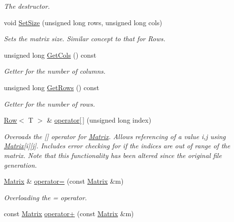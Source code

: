 \begin{DoxyCompactItemize}
\begin{DoxyCompactList}\small\item\em The destructor. \end{DoxyCompactList}\item 
void \hyperlink{class_matrix_afec0d39d2d97ec573024552983694a66}{Set\+Size} (unsigned long rows, unsigned long cols)
\begin{DoxyCompactList}\small\item\em Sets the matrix size. Similar concept to that for Rows. \end{DoxyCompactList}\item 
unsigned long \hyperlink{class_matrix_a0467ce3fc5d310bd78e2c48ae4e80b45}{Get\+Cols} () const 
\begin{DoxyCompactList}\small\item\em Getter for the number of columns. \end{DoxyCompactList}\item 
unsigned long \hyperlink{class_matrix_a7c3e1fb8bf860913a03d874c02655ac2}{Get\+Rows} () const 
\begin{DoxyCompactList}\small\item\em Getter for the number of rows. \end{DoxyCompactList}\item 
\hyperlink{class_row}{Row}$<$ T $>$ \& \hyperlink{class_matrix_ae7e14b4bd8bb570260a4e578e4a601b7}{operator\mbox{[}$\,$\mbox{]}} (unsigned long index)
\begin{DoxyCompactList}\small\item\em Overoads the \mbox{[}\mbox{]} operator for \hyperlink{class_matrix}{Matrix}. Allows referencing of a value i,j using \hyperlink{class_matrix}{Matrix}\mbox{[}i\mbox{]}\mbox{[}j\mbox{]}. Includes error checking for if the indices are out of range of the matrix. Note that this functionality has been altered since the original file generation. \end{DoxyCompactList}\item 
\hyperlink{class_matrix}{Matrix} \& \hyperlink{class_matrix_a94508f84ba0d62e81aa8d508aa43f1ec}{operator=} (const \hyperlink{class_matrix}{Matrix} \&m)
\begin{DoxyCompactList}\small\item\em Overloading the = operator. \end{DoxyCompactList}\item 
const \hyperlink{class_matrix}{Matrix} \hyperlink{class_matrix_a311f3649e41cb4a3155f3f71a65829cb}{operator+} (const \hyperlink{class_matrix}{Matrix} \&m)

\end{DoxyCompactItemize}
